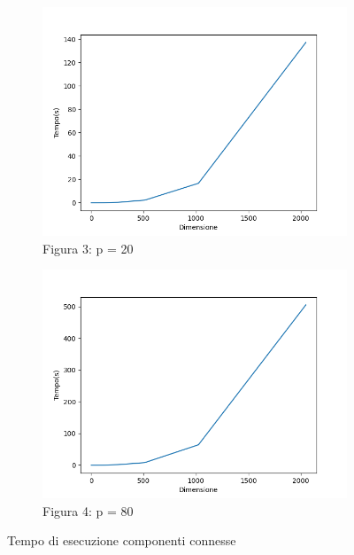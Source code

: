 \documentclass[
]{article}
\begin{document}
\begin{figure}[h!]
	\centering
	\begin{subfigure}[b]{0.4\linewidth}
		\includegraphics[width=\linewidth]{../img/cc/cc_time_p=20.png}
		\caption{Figura 3: p = 20}
	\end{subfigure}
	\begin{subfigure}[b]{0.4\linewidth}
		\includegraphics[width=\linewidth]{../img/cc/cc_time_p=80.png}
		\caption{Figura 4: p = 80}
	\end{subfigure}
	\caption{Tempo di esecuzione componenti connesse}
	\label{fig:CC_2}
\end{figure}

\newpage
\end{document}
